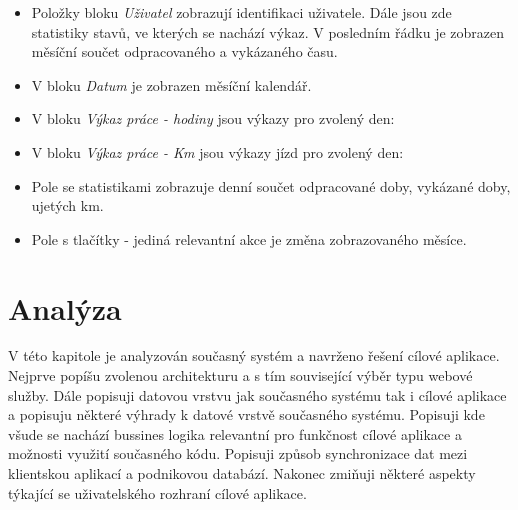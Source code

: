 \documentclass{diplomka}
\begin{document}
\begin{itemize}[noitemsep,nolistsep]
\item Položky bloku \emph{Uživatel} zobrazují identifikaci uživatele. Dále jsou zde statistiky stavů, ve kterých se nachází výkaz. V posledním řádku je zobrazen měsíční součet odpracovaného a vykázaného času.
\item V bloku \emph{Datum} je zobrazen měsíční kalendář.
\item V bloku \emph{Výkaz práce - hodiny} jsou výkazy pro zvolený den:
\item V bloku \emph{Výkaz práce - Km} jsou výkazy jízd pro zvolený den:
\item Pole se statistikami zobrazuje denní součet odpracované doby, vykázané doby, ujetých km. 
\item Pole s tlačítky - jediná relevantní akce je změna zobrazovaného měsíce.
\end{itemize}

\chapter{Analýza}
V této kapitole je analyzován současný systém a navrženo řešení cílové aplikace. Nejprve popíšu zvolenou architekturu a s tím související výběr typu webové služby. Dále popisuji datovou vrstvu jak současného systému tak i cílové aplikace a popisuju některé výhrady k datové vrstvě současného systému. Popisuji kde všude se nachází bussines logika relevantní pro funkčnost cílové aplikace a možnosti využití současného kódu. Popisuji způsob synchronizace dat mezi klientskou aplikací a podnikovou databází. Nakonec zmiňuji některé aspekty týkající se uživatelského rozhraní cílové aplikace.
\end{document}
